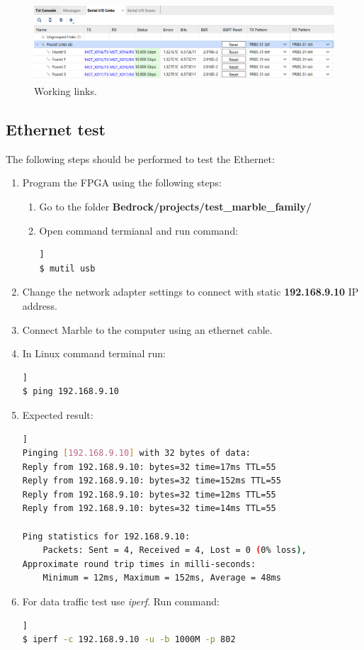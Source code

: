 \documentclass[12pt,oneside,a4]{article}
\begin{document}
\begin{figure}[H]
\begin{center}
\includegraphics[width=1\linewidth]{links.png}
 \caption{Working links.}\label{links}
\end{center}
\end{figure}

\subsection{Ethernet test}
The following steps should be performed to test the Ethernet:
\begin{enumerate}
    \item Program the FPGA using the following steps:
	\begin{enumerate}
	\item Go to the folder \textbf{Bedrock/projects/test\_marble\_family/}
	\item Open command termianal and run command:
	\begin{lstlisting}[backgroundcolor = \color{Gainsboro}, language=bash, frame=none]]
$ mutil usb
	\end{lstlisting}
	\end{enumerate}
    \item Change the network adapter settings to connect with static \textbf{192.168.9.10} IP address.
    \item Connect Marble to the computer using an ethernet cable.
    \item In Linux command terminal run:
    \begin{lstlisting}[backgroundcolor = \color{Gainsboro}, language=bash, frame=none]]
$ ping 192.168.9.10
	\end{lstlisting}
    \item Expected result:
    \begin{lstlisting}[backgroundcolor = \color{Gainsboro}, language=bash, frame=none]]
Pinging [192.168.9.10] with 32 bytes of data:
Reply from 192.168.9.10: bytes=32 time=17ms TTL=55
Reply from 192.168.9.10: bytes=32 time=152ms TTL=55
Reply from 192.168.9.10: bytes=32 time=12ms TTL=55
Reply from 192.168.9.10: bytes=32 time=14ms TTL=55

Ping statistics for 192.168.9.10:
    Packets: Sent = 4, Received = 4, Lost = 0 (0% loss),
Approximate round trip times in milli-seconds:
    Minimum = 12ms, Maximum = 152ms, Average = 48ms
	\end{lstlisting}
    \item For data traffic test use \textit{iperf}. Run command:
    \begin{lstlisting}[backgroundcolor = \color{Gainsboro}, language=bash, frame=none]]
$ iperf -c 192.168.9.10 -u -b 1000M -p 802
	\end{lstlisting}
\end{enumerate}
\end{document}
